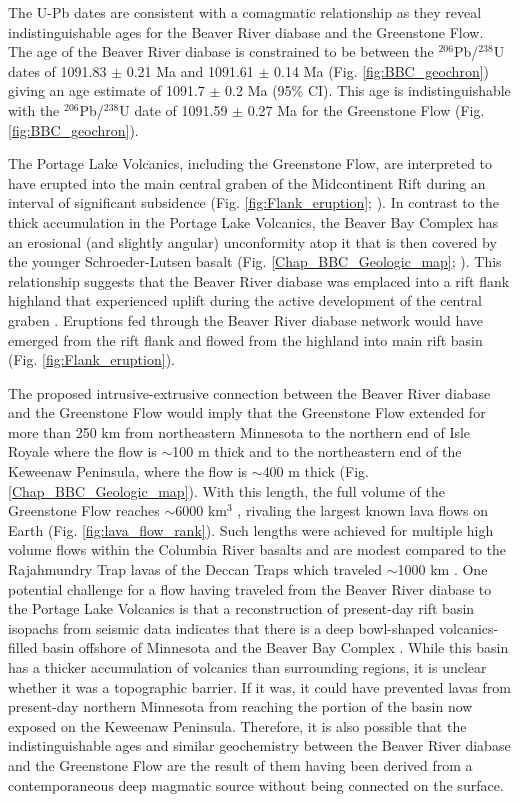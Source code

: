 The U-Pb dates are consistent with a comagmatic relationship as they reveal indistinguishable ages for the Beaver River diabase and the Greenstone Flow. The age of the Beaver River diabase is constrained to be between the $^{206}$Pb/$^{238}$U dates of  1091.83 $\pm$ 0.21 Ma and 1091.61 $\pm$ 0.14 Ma (Fig. \ref{fig:BBC_geochron}) giving an age estimate of 1091.7 $\pm$ 0.2 Ma (95\% CI). This age is indistinguishable with the $^{206}$Pb/$^{238}$U date of 1091.59 $\pm$ 0.27 Ma for the Greenstone Flow (Fig. \ref{fig:BBC_geochron}).

The Portage Lake Volcanics, including the Greenstone Flow, are interpreted to have erupted into the main central graben of the Midcontinent Rift during an interval of significant subsidence (Fig. \ref{fig:Flank_eruption}; \cite{Miller1997a,Cannon1992b}). In contrast to the thick accumulation in the Portage Lake Volcanics, the Beaver Bay Complex has an erosional (and slightly angular) unconformity atop it that is then covered by the younger Schroeder-Lutsen basalt (Fig. \ref{Chap_BBC_Geologic_map}; \cite{Miller2001a}). This relationship suggests that the Beaver River diabase was emplaced into a rift flank highland that experienced uplift during the active development of the central graben \citep{Swanson-Hysell2019a}. Eruptions fed through the Beaver River diabase network would have emerged from the rift flank and flowed from the highland into main rift basin (Fig. \ref{fig:Flank_eruption}). 

The proposed intrusive-extrusive connection between the Beaver River diabase and the Greenstone Flow would imply that the Greenstone Flow extended for more than 250 km from northeastern Minnesota to the northern end of Isle Royale where the flow is $\sim$100 m thick and to the northeastern end of the Keweenaw Peninsula, where the flow is $\sim$400 m thick (Fig. \ref{Chap_BBC_Geologic_map}). With this length, the full volume of the Greenstone Flow reaches $\sim$6000 km$^3$ \citep{Doyle2016a}, rivaling the largest known lava flows on Earth (Fig. \ref{fig:lava_flow_rank}). Such lengths were achieved for multiple high volume flows within the Columbia River basalts \citep{Reidel2013a} and are modest compared to the Rajahmundry Trap lavas of the Deccan Traps which traveled $\sim$1000 km \citep{Self2008a}. One potential challenge for a flow having traveled from the Beaver River diabase to the Portage Lake Volcanics is that a reconstruction of present-day rift basin isopachs from seismic data indicates that there is a deep bowl-shaped volcanics-filled basin offshore of Minnesota and the Beaver Bay Complex \citep{Stewart2018a}. While this basin has a thicker accumulation of volcanics than surrounding regions, it is unclear whether it was a topographic barrier. If it was, it could have prevented lavas from present-day northern Minnesota from reaching the portion of the basin now exposed on the Keweenaw Peninsula. Therefore, it is also possible that the indistinguishable ages and similar geochemistry between the Beaver River diabase and the Greenstone Flow are the result of them having been derived from a contemporaneous deep magmatic source without being connected on the surface. 

